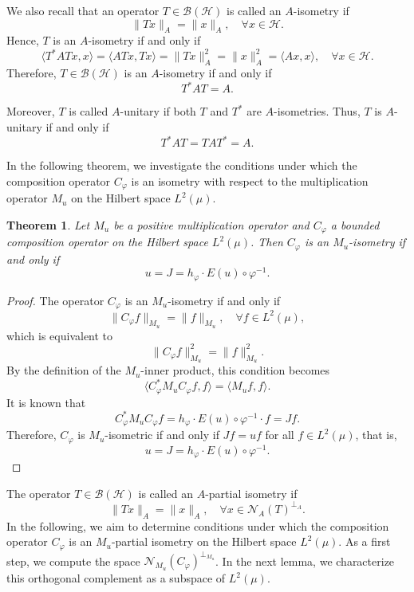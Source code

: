 \documentclass{amsart}
\newtheorem{thm}{Theorem}[section]
\theoremstyle{definition}\newtheorem{defn}[thm]{Definition}
\theoremstyle{remark}
\numberwithin{equation}{section}
\begin{document}
We also recall that an operator \( T \in \mathcal{B}(\mathcal{H}) \) is called an \( A \)-isometry if 
\[
\|Tx\|_A = \|x\|_A, \quad \forall x \in \mathcal{H}.
\]
Hence, \( T \) is an \( A \)-isometry if and only if 
\[
\langle T^* A T x, x \rangle = \langle A T x, T x \rangle = \|T x\|_A^2 = \|x\|_A^2 = \langle A x, x \rangle, \quad \forall x \in \mathcal{H}.
\]
Therefore, \( T \in \mathcal{B}(\mathcal{H}) \) is an \( A \)-isometry if and only if
\[
T^* A T = A.
\]

Moreover, \( T \) is called \( A \)-unitary if both \( T \) and \( T^* \) are \( A \)-isometries. Thus, \( T \) is \( A \)-unitary if and only if
\[
T^* A T = T A T^* = A.
\]

In the following theorem, we investigate the conditions under which the composition operator \( C_{\varphi} \) is an isometry with respect to the multiplication operator \( M_u \) on the Hilbert space \( L^2(\mu) \).
\begin{thm}\label{t1.4}
Let \( M_u \) be a positive multiplication operator and \( C_{\varphi} \) a bounded composition operator on the Hilbert space \( L^2(\mu) \). Then \( C_{\varphi} \) is an \( M_u \)-isometry if and only if 
\[
u = J = h_{\varphi} \cdot E(u) \circ \varphi^{-1}.
\]
\end{thm}

\begin{proof}
The operator \( C_{\varphi} \) is an \( M_u \)-isometry if and only if 
\[
\|C_{\varphi} f\|_{M_u} = \|f\|_{M_u}, \quad \forall f \in L^2(\mu),
\]
which is equivalent to
\[
\|C_{\varphi} f\|_{M_u}^2 = \|f\|_{M_u}^2.
\]
By the definition of the \( M_u \)-inner product, this condition becomes
\[
\langle C_{\varphi}^* M_u C_{\varphi} f, f \rangle = \langle M_u f, f \rangle.
\]
It is known that 
\[
C_{\varphi}^* M_u C_{\varphi} f = h_{\varphi} \cdot E(u) \circ \varphi^{-1} \cdot f = J f.
\]
Therefore, \( C_{\varphi} \) is \( M_u \)-isometric if and only if \( J f = u f \) for all \( f \in L^2(\mu) \), that is,
\[
u = J = h_{\varphi} \cdot E(u) \circ \varphi^{-1}.
\]
\end{proof}
The operator \( T \in \mathcal{B}(\mathcal{H}) \) is called an \( A \)-partial isometry if 
\[
\|T x\|_A = \|x\|_A, \quad \forall x \in \mathcal{N}_A(T)^{\perp_A}.
\]
In the following, we aim to determine conditions under which the composition operator \( C_{\varphi} \) is an \( M_u \)-partial isometry on the Hilbert space \( L^2(\mu) \). As a first step, we compute the space \( \mathcal{N}_{M_u}(C_{\varphi})^{\perp_{M_u}} \). In the next lemma, we characterize this orthogonal complement as a subspace of \( L^2(\mu) \).
\end{document}
